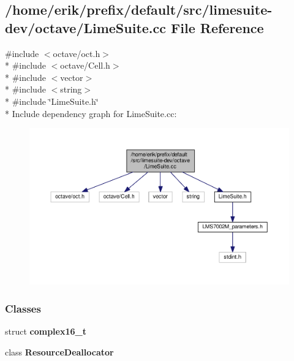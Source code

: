 \subsection{/home/erik/prefix/default/src/limesuite-\/dev/octave/\+Lime\+Suite.cc File Reference}
\label{LimeSuite_8cc}
{\ttfamily \#include $<$octave/oct.\+h$>$}\\*
{\ttfamily \#include $<$octave/\+Cell.\+h$>$}\\*
{\ttfamily \#include $<$vector$>$}\\*
{\ttfamily \#include $<$string$>$}\\*
{\ttfamily \#include \char`\"{}Lime\+Suite.\+h\char`\"{}}\\*
Include dependency graph for Lime\+Suite.\+cc\+:
\nopagebreak
\begin{figure}[H]
\begin{center}
\leavevmode
\includegraphics[width=350pt]{d9/d4d/LimeSuite_8cc__incl}
\end{center}
\end{figure}
\subsubsection*{Classes}
\begin{DoxyCompactItemize}
\item 
struct {\bf complex16\+\_\+t}
\item 
class {\bf Resource\+Deallocator}
\end{DoxyCompactItemize}
